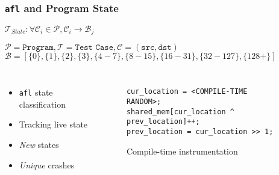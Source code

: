 \begin{frame}[fragile]
\frametitle{\texttt{afl} and Program State}

\begin{center}
$\mathcal{T}_{State}\colon \forall \mathcal{C}_i\in\mathcal{P}, \mathcal{C}_i\rightarrow \mathcal{B}_j$
\end{center}

$\mathcal{P} = \texttt{Program}, \mathcal{T} = \texttt{Test Case}, \mathcal{C} = (\texttt{src}, \texttt{dst})$
$\mathcal{B} = [\{0\}, \{1\}, \{2\}, \{3\}, \{4-7\}, \{8-15\}, \{16-31\}, \{32-127\}, \{128+\}]$


\begin{columns}[c]


\begin{itemize}
    \item \texttt{afl} state classification
    \item Tracking live state
    \item \textit{New} states
    \item \textit{Unique} crashes
\end{itemize}


\begin{figure}
\begin{lstlisting}[language={[ANSI]C},frame=single,numbers=none]
cur_location = <COMPILE-TIME RANDOM>;
shared_mem[cur_location ^ prev_location]++;
prev_location = cur_location >> 1;\end{lstlisting}
\caption{Compile-time instrumentation}
\label{fig:instrumentation}
\end{figure}

\end{columns}

\end{frame}
